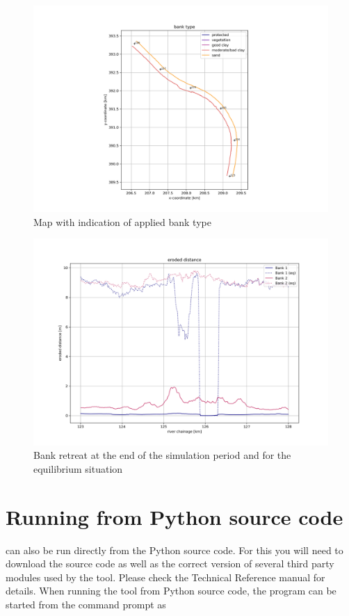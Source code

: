 \begin{figure}
\includegraphics[width=\textwidth]{figures/10_banktype.png}
\caption{Map with indication of applied bank type}
\label{Fig2.12}
\end{figure}
\clearpage
\begin{figure}
\includegraphics[width=\textwidth]{figures/11_erodis.png}
\caption{Bank retreat at the end of the simulation period and for the equilibrium situation}
\label{Fig2.13}
\end{figure}

\section{Running from Python source code} \label{Sec:Python}
\dfastbe can also be run directly from the Python source code.
For this you will need to download the source code as well as the correct version of several third party modules used by the tool.
Please check the \dfastbe Technical Reference manual for details.
When running the tool from Python source code, the program can be started from the command prompt as

